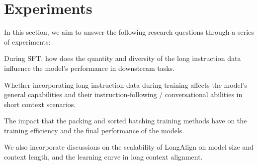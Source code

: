 \section{Experiments}
\label{sec:experiments}
In this section, we aim to answer the following research questions through a series of experiments:

During SFT, how does the quantity and diversity of the long instruction data influence the model's performance in downstream tasks.

Whether incorporating long instruction data during training affects the model's general capabilities and their instruction-following / conversational abilities in short context scenarios.

The impact that the packing and sorted batching training methods have on the training efficiency and the final performance of the models.

\noindent
We also incorporate discussions on the scalability of LongAlign on model size and context length, and the learning curve in long context alignment.

\begin{table*}[t]
\centering  
{}
\caption{Performance of ChatGLM3-6B-64k after training on different quantities and types of long instruction data.}
\label{tb:exp1}
\end{table*}

